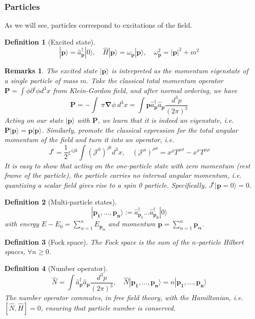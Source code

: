 \documentclass[a4paper]{article}
\newtheorem{remarks}{Remarks}[section]
\theoremstyle{new}
\newtheorem{defi}{Definition}[section]
\begin{document}
\subsubsection{Particles}
As we will see, particles correspond to excitations of the field. 
\begin{defi}[Excited state]
$$|\mathbf{p}\rangle=\hat{a}_{\mathbf{p}}^\dag|0\rangle,\quad\hat{H}|\mathbf{p}\rangle=\omega_{\mathbf{p}}|\mathbf{p}\rangle,\quad\omega_{\mathbf{p}}^2=|\mathbf{p}|^2+m^2$$
\end{defi}
\begin{remarks}
The excited state $|\mathbf{p}\rangle$ is interpreted as the momentum eigenstate of a single particle of mass $m$. Take the classical total momentum operator $\mathbf{P}=\int \dot{\phi}\partial^i\phi d^3x$ from Klein-Gordon field, and after normal ordering, we have
$$\mathbf{P}=-\int~\pi\boldsymbol{\nabla}\phi~d^3x=\int\mathbf{p}\hat{a}_{\mathbf{p}}^\dag\hat{a}_{\mathbf{p}}\frac{d^3p}{(2\pi)^3}$$
Acting on our state $|\mathbf{p}\rangle$ with $\mathbf{P}$, we learn that it is indeed an eigenstate, i.e. $\mathbf{P}|\mathbf{p}\rangle=\mathbf{p}|\mathbf{p}\rangle$. Similarly, promote the classical expression for the total angular momentum of the field and turn it into an operator, i.e.
$$J^i=\frac{1}{2}\varepsilon^{ijk}\int(\mathcal{J}^0)^{jk}d^3x,\quad (\mathcal{J}^\mu)^{\rho\sigma}=x^\rho T^{\mu\sigma}-x^\sigma T^{\mu\rho}$$
It is easy to show that acting on the one-particle state with zero momentum (rest frame of the particle), the particle carries no internal angular momentum, i.e. quantizing a scalar field gives rise to a spin 0 particle. Specifically, $J^i|\mathbf{p}=0\rangle=0$.
\end{remarks}
\begin{defi}[Multi-particle states]
$$|\mathbf{p_1},\dots,\mathbf{p_n}\rangle:=\hat{a}_{\mathbf{p_1}}^\dag\dots\hat{a}_{\mathbf{p_n}}^\dag|0\rangle$$
with energy $E-E_0=\sum_{\alpha=1}^nE_{\mathbf{p_\alpha}}$ and momentum $\mathbf{p}=\sum_{\alpha=1}^n\mathbf{p_{\alpha}}$.
\end{defi}
\begin{defi}[Fock space]
The Fock space is the sum of the $n$-particle Hilbert spaces, $\forall n\geq0$. 
\end{defi}
\begin{defi}[Number operator]
$$\hat{N}=\int\hat{a}_{\mathbf{p}}^\dag\hat{a}_{\mathbf{p}}\frac{d^3p}{(2\pi)^3},\quad\hat{N}|\mathbf{p_1},\dots,\mathbf{p_n}\rangle=n|\mathbf{p_1},\dots,\mathbf{p_n}\rangle$$
The number operator commutes, in free field theory, with the Hamiltonian, i.e. $[\hat{N},\hat{H}]=0$, ensuring that particle number is conserved.
\end{defi}
\end{document}
